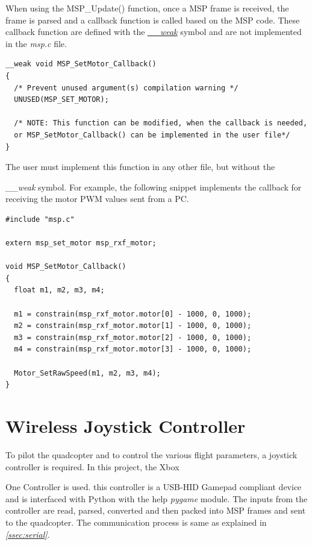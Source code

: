 \documentclass[a4paper,12pt,oneside]{book}
\begin{document}
When using the {MSP{\_}Update()} function, once a MSP frame is received, the frame is parsed and a callback function is called based on the MSP code. These callback function are defined with the \href{http://www.keil.com/support/man/docs/armcc/armcc_chr1359124970859.htm}{\textit{{\_\_}weak}} symbol and are not implemented in the \textit{msp.c} file.\\

\begin{verbatim}
__weak void MSP_SetMotor_Callback()
{
  /* Prevent unused argument(s) compilation warning */
  UNUSED(MSP_SET_MOTOR);
  
  /* NOTE: This function can be modified, when the callback is needed,
  or MSP_SetMotor_Callback() can be implemented in the user file*/
}
\end{verbatim}

\bigskip

The user must implement this function in any other file, but without the {\textit{{\_\_}weak} symbol. For example, the following snippet implements the callback for receiving the motor PWM values sent from a PC.\\

\begin{verbatim}
#include "msp.c"

extern msp_set_motor msp_rxf_motor;

void MSP_SetMotor_Callback()
{
  float m1, m2, m3, m4;

  m1 = constrain(msp_rxf_motor.motor[0] - 1000, 0, 1000);
  m2 = constrain(msp_rxf_motor.motor[1] - 1000, 0, 1000);
  m3 = constrain(msp_rxf_motor.motor[2] - 1000, 0, 1000);
  m4 = constrain(msp_rxf_motor.motor[3] - 1000, 0, 1000);

  Motor_SetRawSpeed(m1, m2, m3, m4);
}
\end{verbatim}

\clearpage

\section{Wireless Joystick Controller}
\label{sec:joystick}

To pilot the quadcopter and to control the various flight parameters, a joystick controller is required. In this project, the Xbox\textregistered} One Controller\cite{xbox} is used. this controller is a USB-HID Gamepad compliant device and is interfaced with Python with the help \textit{pygame} module. The inputs from the controller are read, parsed, converted and then packed into MSP frames and sent to the quadcopter. The communication process is same as explained in \textit{\autoref{ssec:serial}}.\\
\end{document}
